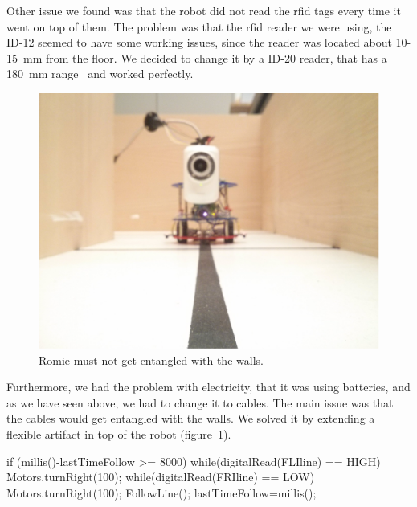 Other issue we found was that the robot did not read the \acrshort{rfid} tags every time it went on
top of them. The problem was that the \acrshort{rfid} reader we were using, the ID-12 seemed to have
some working issues, since the reader was located about 10-15~mm from the floor. We decided to
change it by a ID-20 reader, that has a 180~mm range~\cite{rfid} and worked perfectly.

\begin{figure}[!htbp]
	\centering
	\includegraphics[height=0.35\textheight]{fig/lines}
	\caption{Romie must not get entangled with the walls.}
	\label{fig:lines}
\end{figure}

Furthermore, we had the problem with electricity, that it was using batteries, and as we have seen
above, we had to change it to cables. The main issue was that the cables would get entangled with
the walls. We solved it by extending a flexible artifact in top of the robot
(figure~\ref{fig:lines}).

\begin{center}
\begin{minipage}{.9\textwidth}
\singlespace
{}
\begin{pyglist}[language=c, caption={Arduino code for returning if wall was hit.},
	label={alg:romie_wall}, listingname={Algorithm}, numbers=left]
if (millis()-lastTimeFollow >= 8000) {
	while(digitalRead(FLIline) == HIGH) Motors.turnRight(100);
	while(digitalRead(FRIline) == LOW) Motors.turnRight(100);
	FollowLine();
	lastTimeFollow=millis();
}
\end{pyglist}
\end{minipage}
\end{center}

